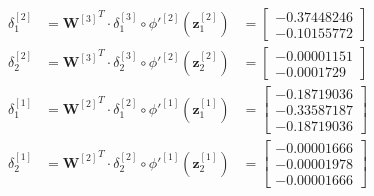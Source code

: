 \documentclass[12pt]{article}
\begin{document}
\begin{enumerate}[leftmargin=\labelsep]
    \begin{equation}
    \begin{aligned}
        \delta_1^{[2]} &= {\mathbf{W}^{[3]}}^T \cdot \delta_1^{[3]} \circ \phi'^{[2]}(\mathbf{z}_1^{[2]})
        &= \begin{bmatrix}
            -0.37448246 \\ -0.10155772
        \end{bmatrix} \\
        \delta_2^{[2]} &= {\mathbf{W}^{[3]}}^T \cdot \delta_2^{[3]} \circ \phi'^{[2]}(\mathbf{z}_2^{[2]})
        &= \begin{bmatrix}
            -0.00001151 \\ -0.0001729 
        \end{bmatrix} \\
        \delta_1^{[1]} &= {\mathbf{W}^{[2]}}^T \cdot \delta_1^{[2]} \circ \phi'^{[1]}(\mathbf{z}_1^{[1]})
        &= \begin{bmatrix}
            -0.18719036 \\ -0.33587187 \\ -0.18719036
        \end{bmatrix} \\
        \delta_2^{[1]} &= {\mathbf{W}^{[2]}}^T \cdot \delta_2^{[2]} \circ \phi'^{[1]}(\mathbf{z}_2^{[1]})
        &= \begin{bmatrix}
            -0.00001666 \\ -0.00001978 \\ -0.00001666
        \end{bmatrix}
    \end{aligned}
    \end{equation}


\end{enumerate}
\end{document}
